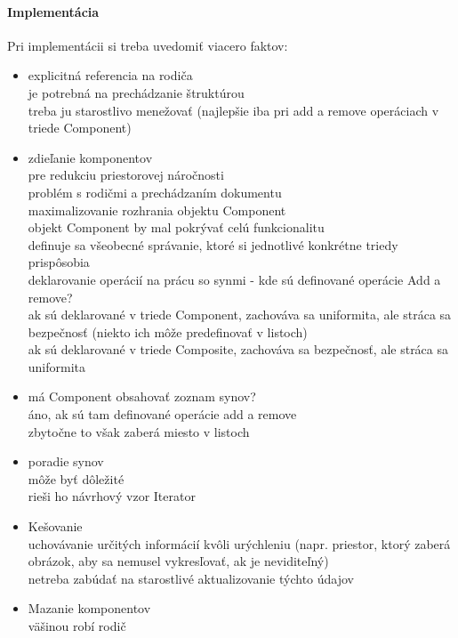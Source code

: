 		\paragraph{Implementácia}
		Pri implementácii si treba uvedomiť viacero faktov:
			\begin{itemize}
			\item explicitná referencia na rodiča \\
				je potrebná na prechádzanie štruktúrou\\
			 	treba ju starostlivo menežovať (najlepšie iba pri add a remove operáciach v triede Component)
			\item zdieľanie komponentov\\
			pre redukciu priestorovej náročnosti\\
			problém s rodičmi a prechádzaním dokumentu\\
			maximalizovanie rozhrania objektu Component\\
			objekt Component by mal pokrývať celú funkcionalitu\\
			definuje sa všeobecné správanie, ktoré si jednotlivé konkrétne triedy prispôsobia\\
			deklarovanie operácií na prácu so synmi - kde sú definované operácie Add a remove?\\
			ak sú deklarované v triede Component, zachováva sa uniformita, ale stráca sa bezpečnosť (niekto ich môže predefinovať v listoch)\\
			ak sú deklarované v triede Composite, zachováva sa bezpečnosť, ale stráca sa uniformita\\
			\item má Component obsahovať zoznam synov?\\
			áno, ak sú tam definované operácie add a remove\\
			zbytočne to však zaberá miesto v listoch
			\item poradie synov\\
			môže byť dôležité\\
			rieši ho návrhový vzor Iterator
			\item Kešovanie\\
			uchovávanie určitých informácií kvôli urýchleniu (napr. priestor, ktorý zaberá obrázok, aby sa nemusel vykresľovať, ak je neviditeľný)\\
			netreba zabúdať na starostlivé aktualizovanie týchto údajov
			\item Mazanie komponentov\\
			väšinou robí rodič

			\end{itemize}



